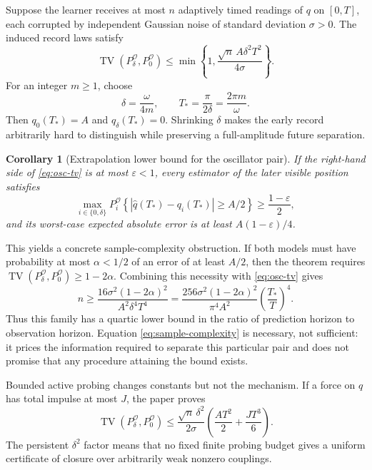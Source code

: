 \documentclass[10pt]{article}
\newtheorem{corollary}[theorem]{Corollary}
\newcommand{\TV}{\operatorname{TV}}
\begin{document}
Suppose the learner receives at most $n$ adaptively timed readings of $q$ on $[0,T]$, each corrupted by independent Gaussian noise of standard deviation $\sigma>0$. The induced record laws satisfy \cite{landers2026}
\begin{equation}
\TV(P_\delta^{\mathcal O},P_0^{\mathcal O})
\leq\min\!\left\{1,
\frac{\sqrt n\,A\delta^2T^2}{4\sigma}\right\}.
\label{eq:osc-tv}
\end{equation}
For an integer $m\geq1$, choose
\[
\delta=\frac{\omega}{4m},
\qquad
T_*=\frac{\pi}{2\delta}=\frac{2\pi m}{\omega}.
\]
Then $q_0(T_*)=A$ and $q_\delta(T_*)=0$. Shrinking $\delta$ makes the early record arbitrarily hard to distinguish while preserving a full-amplitude future separation.

\begin{corollary}[Extrapolation lower bound for the oscillator pair]
If the right-hand side of \eqref{eq:osc-tv} is at most $\varepsilon<1$, every estimator of the later visible position satisfies
\[
\max_{i\in\{0,\delta\}}
P_i^{\mathcal O}\!\left\{
|\widehat q(T_*)-q_i(T_*)|\geq A/2
\right\}
\geq\frac{1-\varepsilon}{2},
\]
and its worst-case expected absolute error is at least $A(1-\varepsilon)/4$.
\end{corollary}

This yields a concrete sample-complexity obstruction. If both models must have probability at most $\alpha<1/2$ of an error of at least $A/2$, then the theorem requires $\TV(P_\delta^{\mathcal O},P_0^{\mathcal O})\geq1-2\alpha$. Combining this necessity with \eqref{eq:osc-tv} gives
\begin{equation}
n\geq
\frac{16\sigma^2(1-2\alpha)^2}{A^2\delta^4T^4}
=\frac{256\sigma^2(1-2\alpha)^2}{\pi^4A^2}
\left(\frac{T_*}{T}\right)^4.
\label{eq:sample-complexity}
\end{equation}
Thus this family has a quartic lower bound in the ratio of prediction horizon to observation horizon. Equation \eqref{eq:sample-complexity} is necessary, not sufficient: it prices the information required to separate this particular pair and does not promise that any procedure attaining the bound exists.

Bounded active probing changes constants but not the mechanism. If a force on $q$ has total impulse at most $J$, the paper proves
\[
\TV(P_\delta^{\mathcal O},P_0^{\mathcal O})
\leq \frac{\sqrt n\,\delta^2}{2\sigma}
\left(\frac{AT^2}{2}+\frac{JT^3}{6}\right).
\]
The persistent $\delta^2$ factor means that no fixed finite probing budget gives a uniform certificate of closure over arbitrarily weak nonzero couplings.
\end{document}
